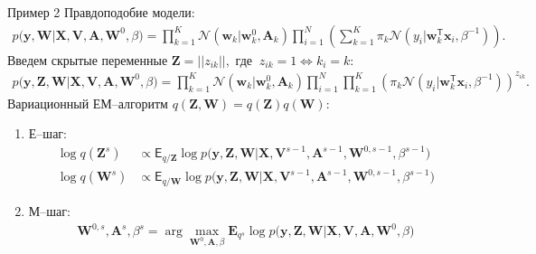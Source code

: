 \documentclass[9pt,pdf,hyperref={unicode}]{beamer}
\begin{document}
\begin{frame}{Пример 2}
\justifying
Правдоподобие модели:
	\begin{equation}
	\label{sl:6:eq:1}
		\begin{aligned}
			p\bigr(\mathbf{y}, \mathbf{W}|\mathbf{X}, \mathbf{V}, \textbf{A}, \textbf{W}^{0}, \beta\bigr) = \prod_{k=1}^{K}\mathcal{N}\left(\mathbf{w}_{k}|\mathbf{w}^{0}_{k}, \mathbf{A}_{k}\right)\prod_{i=1}^{N}\left(\sum_{k=1}^{K}\pi_{k}\mathcal{N}\left(y_{i}|\mathbf{w}_{k}^{\mathsf{T}}\mathbf{x}_{i}, \beta^{-1}\right)\right).
		\end{aligned}
	\end{equation}
Введем скрытые переменные $\textbf{Z} = ||z_{ik}||,$ где $~z_{ik} = 1 \Leftrightarrow k_i=k$:
	\begin{equation}
	\label{sl:6:eq:2}
		\begin{aligned}
			p\bigr(\mathbf{y}, \textbf{Z}, \mathbf{W}|\mathbf{X}, \mathbf{V}, \textbf{A}, \textbf{W}^{0}, \beta\bigr) = \prod_{k=1}^{K}\mathcal{N}\left(\mathbf{w}_{k}|\mathbf{w}^{0}_{k}, \mathbf{A}_{k}\right)\prod_{i=1}^{N}\prod_{k=1}^{K}\left(\pi_{k}\mathcal{N}\left(y_{i}|\mathbf{w}_{k}^{\mathsf{T}}\mathbf{x}_{i}, \beta^{-1}\right)\right)^{z_{ik}}.		
		\end{aligned}
	\end{equation}
Вариационный ЕМ--алгоритм $q\left(\textbf{Z}, \textbf{W}\right) = q\left(\textbf{Z}\right)q\left(\textbf{W}\right)$:
	\begin{enumerate}
		\item Е--шаг: 
			\begin{equation}
			\label{sl:6:eq:3}
				\begin{aligned}
					\log q\left(\textbf{Z}^{s}\right) &\propto \mathsf{E}_{q/\textbf{Z}}\log p\bigr(\mathbf{y}, \textbf{Z},\mathbf{W}|\mathbf{X}, \mathbf{V}^{s-1}, \textbf{A}^{s-1}, \textbf{W}^{0, s-1}, \beta^{s-1}\bigr)\\
					\log q\left(\textbf{W}^{s}\right) &\propto \mathsf{E}_{q/\textbf{W}}\log p\bigr(\mathbf{y}, \textbf{Z},\mathbf{W}|\mathbf{X}, \mathbf{V}^{s-1}, \textbf{A}^{s-1}, \textbf{W}^{0, s-1}, \beta^{s-1}\bigr)
				\end{aligned}
			\end{equation}
		\item М--шаг: 
			\begin{equation}
			\label{sl:6:eq:4}
				\begin{aligned}
					\textbf{W}^{0, s}, \textbf{A}^{s}, \beta^{s} = \arg\max_{\textbf{W}^{0}, \textbf{A}, \beta} \mathbf{E}_{q^{s}}\log p\bigr(\mathbf{y}, \textbf{Z},\mathbf{W}|\mathbf{X}, \mathbf{V}, \textbf{A}, \textbf{W}^{0}, \beta\bigr)
				\end{aligned}
			\end{equation}
	\end{enumerate}
\end{frame}
\end{document}
